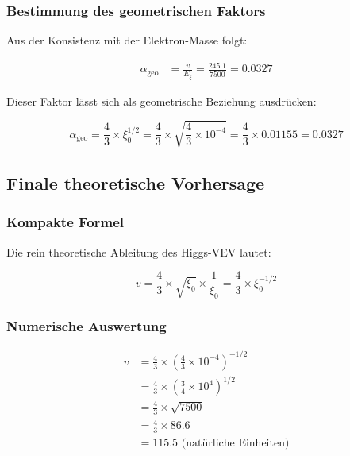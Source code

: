 \documentclass[12pt,a4paper]{article}
\theoremstyle{definition}
\begin{document}
\subsubsection{Bestimmung des geometrischen Faktors}

Aus der Konsistenz mit der Elektron-Masse folgt:

\begin{align}
	\alpha_{\text{geo}} &= \frac{v}{E_\xi} = \frac{245.1}{7500} = 0.0327
\end{align}

Dieser Faktor l{\"a}sst sich als geometrische Beziehung ausdr{\"u}cken:

\begin{equation}
	\alpha_{\text{geo}} = \frac{4}{3} \times \xi_0^{1/2} = \frac{4}{3} \times \sqrt{\frac{4}{3} \times 10^{-4}} = \frac{4}{3} \times 0.01155 = 0.0327
\end{equation}

\subsection{Finale theoretische Vorhersage}

\subsubsection{Kompakte Formel}

Die rein theoretische Ableitung des Higgs-VEV lautet:

\begin{equation}
	\boxed{v = \frac{4}{3} \times \sqrt{\xi_0} \times \frac{1}{\xi_0} = \frac{4}{3} \times \xi_0^{-1/2}}
\end{equation}

\subsubsection{Numerische Auswertung}

\begin{align}
	v &= \frac{4}{3} \times \left(\frac{4}{3} \times 10^{-4}\right)^{-1/2}\\
	&= \frac{4}{3} \times \left(\frac{3}{4} \times 10^{4}\right)^{1/2}\\
	&= \frac{4}{3} \times \sqrt{7500}\\
	&= \frac{4}{3} \times 86.6\\
	&= 115.5 \text{ (nat{\"u}rliche Einheiten)}
\end{align}
\end{document}
